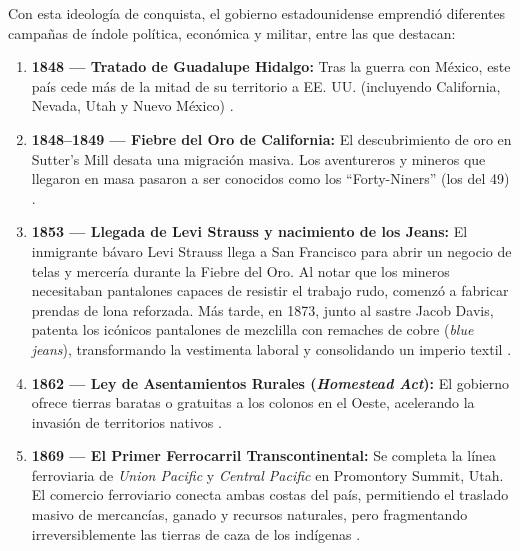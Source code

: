 Con esta ideología de conquista, el gobierno estadounidense emprendió diferentes campañas
de índole política, económica y militar, entre las que destacan:
\begin{enumerate}
    \item \textbf{1848 — Tratado de Guadalupe Hidalgo:} Tras la guerra con México, este país cede más de la mitad de
        su territorio a EE. UU. (incluyendo California, Nevada, Utah y Nuevo México) \cite{white1991it}.

    \item \textbf{1848–1849 — Fiebre del Oro de California:} El descubrimiento de oro en Sutter's Mill desata
        una migración masiva. Los aventureros y mineros que llegaron en masa pasaron a ser conocidos
        como los ``Forty-Niners'' (los del 49) \cite{white1991it}.

    \item \textbf{1853 — Llegada de Levi Strauss y nacimiento de los Jeans:} El inmigrante bávaro Levi Strauss
        llega a San Francisco para abrir un negocio de telas y mercería durante la Fiebre del Oro.
        Al notar que los mineros necesitaban pantalones capaces de resistir el trabajo rudo, comenzó
        a fabricar prendas de lona reforzada. Más tarde, en 1873, junto al sastre Jacob Davis, patenta los
        icónicos pantalones de mezclilla con remaches de cobre (\textit{blue jeans}),
        transformando la vestimenta laboral y consolidando un imperio textil \cite{downey1992levis}.

    \item \textbf{1862 — Ley de Asentamientos Rurales (\textit{Homestead Act}):} El gobierno ofrece
        tierras baratas o gratuitas a los colonos en el Oeste, acelerando la invasión de territorios
        nativos \cite{white1991it, brown1970bury}.

    \item \textbf{1869 — El Primer Ferrocarril Transcontinental:} Se completa la línea
        ferroviaria de \textit{Union Pacific} y \textit{Central Pacific} en Promontory Summit, Utah.
        El comercio ferroviario conecta ambas costas del país, permitiendo el traslado masivo de mercancías,
        ganado y recursos naturales, pero fragmentando irreversiblemente las tierras de caza de los
        indígenas \cite{white1991it, turner1920frontier}.
\end{enumerate}
